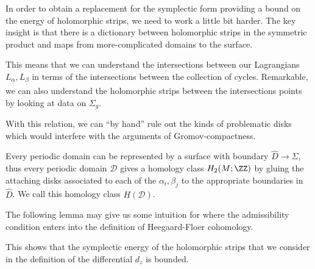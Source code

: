 
In order to obtain a replacement for the symplectic form providing a bound on the energy of holomorphic strips, we need to work a little bit harder. The key insight is that there is a dictionary between holomorphic strips in the symmetric product and maps from more-complicated domains to the surface.


This means that we can understand the intersections between our Lagrangians $L_{\underline \alpha}, L_{\underline \beta}$ in terms of the intersections between the collection of cycles. Remarkable, we can also understand the holomorphic strips between the intersections points by looking at data on $\Sigma_g$. 

With this relation, we can ``by hand'' rule out the kinds of problematic disks which would interfere with the arguments of Gromov-compactness.


    Every periodic domain can be represented by a surface with boundary $\hat D\to \Sigma$, thus every periodic domain $\mathcal D$ gives a homology class $H_2(M; \ZZ)$ by gluing the attaching disks associated to each of the $\alpha_i, \beta_j$ to the appropriate boundaries in $\hat D$. We call this homology class $H(\mathcal D)$.

The following lemma may give us some intuition for where the admissibility condition enters into the definition of Heegaard-Floer cohomology.


This shows that the symplectic energy of the holomorphic strips that we consider in the definition of the differential $d_z$ is bounded. 